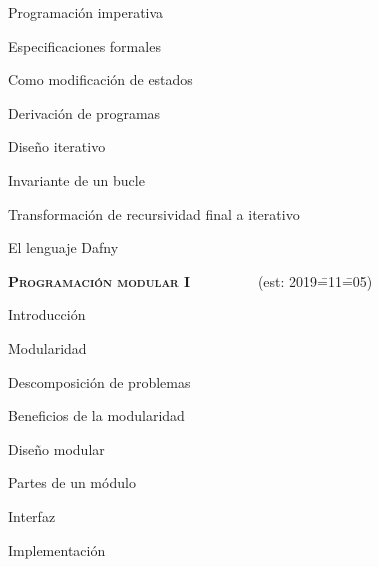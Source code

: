 \begin{longenum}
\begin{longenum}
\begin{longenum}
\begin{longenum}
\begin{longenum}
                \end{longenum}
            \end{longenum}
        \end{longenum}
        \item Programación imperativa
        \begin{longenum}
            \item Especificaciones formales
            \begin{longenum}
                \item Como modificación de estados
            \end{longenum}
            \item Derivación de programas
            \begin{longenum}
                \item Diseño iterativo
                \begin{longenum}
                    \item Invariante de un bucle
                    \item Transformación de recursividad final a iterativo
                \end{longenum}
            \end{longenum}
        \end{longenum}
        \item El lenguaje Dafny \opcional\
    \end{longenum}
    \item \textbf{\textsc{Programación modular I}} \ \ \ \ \ \ \ \ \ (est: 2019\==11\==05)
    \begin{longenum}
        \item Introducción
        \begin{longenum}
            \item Modularidad
            \item Descomposición de problemas
            \item Beneficios de la modularidad
        \end{longenum}
        \item Diseño modular
        \begin{longenum}
            \item Partes de un módulo
            \begin{longenum}
                \item Interfaz
                \item Implementación

\end{longenum}
\end{longenum}
\end{longenum}
\end{longenum}
